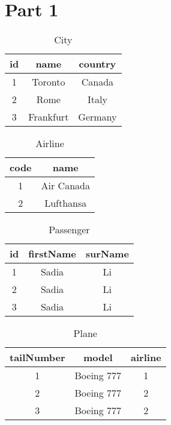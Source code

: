 \section{Part 1}
\begin{table}[h!]
\centering         
\begin{tabular}{|c|c|c|} 
\hline             
id & name & country \\ 
\hline
1 & Toronto & Canada \\ 
\hline
2 & Rome & Italy \\
\hline
3 & Frankfurt & Germany \\ 
\hline
\end{tabular}
\caption{City} 
\label{tab:example} 
\end{table}

\begin{table}[h!] 
\centering          
\begin{tabular}{|c|c|} 
\hline             
code & name \\ 
\hline
1 & Air Canada \\ 
\hline
2 & Lufthansa \\ 
\hline
\end{tabular}
\caption{Airline} 
\label{tab:example} 
\end{table}

\begin{table}[h!]
\centering         
\begin{tabular}{|c|c|c|} 
\hline             
id & firstName & surName \\ 
\hline
1 & Sadia & Li \\ 
\hline
2 & Sadia & Li \\ 
\hline
3 & Sadia & Li \\ 
\hline
\end{tabular}
\caption{Passenger} 
\label{tab:example} 
\end{table}

\begin{table}[h!]
\centering         
\begin{tabular}{|c|c|c|} 
\hline             
tailNumber & model & airline \\ 
\hline
1 & Boeing 777 & 1 \\ 
\hline
2 & Boeing 777 & 2 \\
\hline
3 & Boeing 777 & 2 \\ 
\hline
\end{tabular}
\caption{Plane} 
\label{tab:example} 
\end{table}

